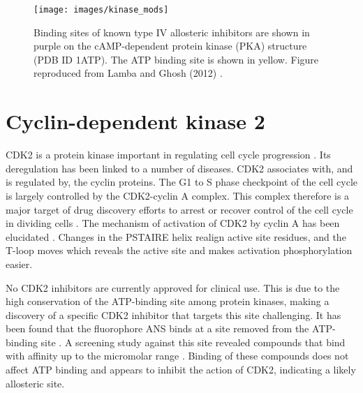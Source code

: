 \begin{figure}
\centering

\texttt{[image: images/kinase\_mods]}

\caption{Binding sites of known type IV allosteric inhibitors are shown in purple on the cAMP-dependent protein kinase (PKA) structure (PDB ID 1ATP).
The ATP binding site is shown in yellow.
Figure reproduced from Lamba and Ghosh (2012) \cite{Lamba2012}.}

\label{fig:kinase_mods}
\end{figure}


\section{Cyclin-dependent kinase 2}

CDK2 is a protein kinase important in regulating cell cycle progression \cite{Peyressatre2015}.
Its deregulation has been linked to a number of diseases.
CDK2 associates with, and is regulated by, the cyclin proteins.
The G1 to S phase checkpoint of the cell cycle is largely controlled by the CDK2-cyclin A complex.
This complex therefore is a major target of drug discovery efforts to arrest or recover control of the cell cycle in dividing cells \cite{Betzi2011}.
The mechanism of activation of CDK2 by cyclin A has been elucidated \cite{Jeffrey1995}.
Changes in the PSTAIRE helix realign active site residues, and the T-loop moves which reveals the active site and makes activation phosphorylation easier.

No CDK2 inhibitors are currently approved for clinical use.
This is due to the high conservation of the ATP-binding site among protein kinases, making a discovery of a specific CDK2 inhibitor that targets this site challenging.
It has been found that the fluorophore ANS binds at a site removed from the ATP-binding site \cite{Betzi2011}.
A screening study against this site revealed compounds that bind with affinity up to the micromolar range \cite{Rastelli2014}.
Binding of these compounds does not affect ATP binding and appears to inhibit the action of CDK2, indicating a likely allosteric site.
